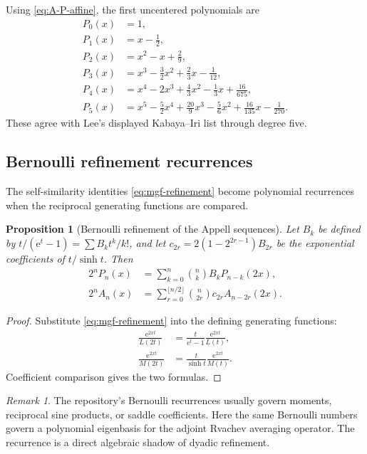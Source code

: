 \documentclass[11pt,oneside]{article}
\theoremstyle{frontier}
\newtheorem{proposition}[theorem]{Proposition}
\theoremstyle{definition}
\theoremstyle{remark}
\newtheorem{remark}[theorem]{Remark}
\newcommand{\e}{\mathrm e}
\begin{document}
Using \eqref{eq:A-P-affine}, the first uncentered polynomials are
\begin{equation}
\begin{aligned}
 P_0(x)&=1,\\
 P_1(x)&=x-\frac12,\\
 P_2(x)&=x^2-x+\frac29,\\
 P_3(x)&=x^3-\frac32x^2+\frac23x-\frac1{12},\\
 P_4(x)&=x^4-2x^3+\frac43x^2-\frac13x+\frac{16}{675},\\
 P_5(x)&=x^5-\frac52x^4+\frac{20}{9}x^3-\frac56x^2+\frac{16}{135}x-\frac1{270}.
\end{aligned}
\label{eq:P-first-polys}
\end{equation}
These agree with Lee's displayed Kabaya--Iri list through degree five.

\subsection{Bernoulli refinement recurrences}

The self-similarity identities \eqref{eq:mgf-refinement} become polynomial recurrences when the
reciprocal generating functions are compared.

\begin{proposition}[Bernoulli refinement of the Appell sequences]
\label{prop:Bernoulli-refinement}
Let $B_k$ be defined by $t/(\e^t-1)=\sum B_kt^k/k!$, and let
$c_{2r}=2(1-2^{2r-1})B_{2r}$ be the exponential coefficients of
$t/\sinh t$.  Then
\begin{align}
 2^nP_n(x)
 &=\sum_{k=0}^n\binom nkB_kP_{n-k}(2x),
 \label{eq:P-Bernoulli-refinement}\\
 2^nA_n(x)
 &=\sum_{r=0}^{\lfloor n/2\rfloor}
   \binom n{2r}c_{2r}A_{n-2r}(2x).
 \label{eq:A-Bernoulli-refinement}
\end{align}
\end{proposition}

\begin{proof}
Substitute \eqref{eq:mgf-refinement} into the defining generating functions:
\begin{align*}
 \frac{\e^{2xt}}{L(2t)}
 &=\frac{t}{\e^t-1}\frac{\e^{2xt}}{L(t)},\\
 \frac{\e^{2xt}}{M(2t)}
 &=\frac{t}{\sinh t}\frac{\e^{2xt}}{M(t)}.
\end{align*}
Coefficient comparison gives the two formulas.
\end{proof}

\begin{remark}
The repository's Bernoulli recurrences usually govern moments, reciprocal sine products, or saddle
coefficients.  Here the same Bernoulli numbers govern a polynomial eigenbasis for the adjoint
Rvachev averaging operator.  The recurrence is a direct algebraic shadow of dyadic refinement.
\end{remark}
\end{document}
